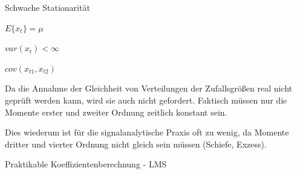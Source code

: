 \documentclass[a4paper]{article}
\begin{document}
\begin{multicols}{3}
  Schwache Stationarität

  \begin{itemize*}
    \item $E\{x_t\}=\mu$
    \item $var(x_t)<\infty$
    \item $cov(x_{t1}, x_{t2})$
    \item Da die Annahme der Gleichheit von Verteilungen der Zufallsgrößen real nicht geprüft werden kann, wird sie auch nicht gefordert. Faktisch müssen nur die Momente erster und zweiter Ordnung zeitlich konstant sein.
    \item Dies wiederum ist für die signalanalytische Praxis oft zu wenig, da Momente dritter und vierter Ordnung nicht gleich sein müssen (Schiefe, Exzess).
  \end{itemize*}

  Praktikable Koeffizientenberechnung - LMS


\end{multicols}
\end{document}
